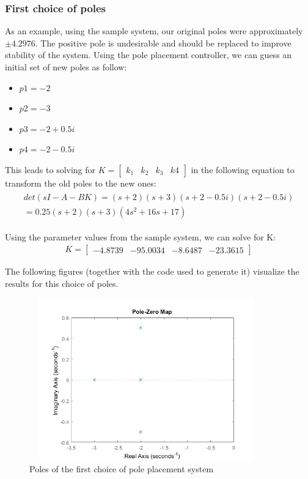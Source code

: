 \documentclass [12pt,letterpaper]{exam}
\begin{document}
\subsubsection{First choice of poles}
As an example, using the sample system, our original poles were approximately $\pm4.2976$. The positive pole is undesirable and should be replaced to improve stability of the system. Using the pole placement controller, we can guess an initial set of new poles as follow:
\begin{itemize}
    \item $p1 = -2$
    \item $p2 = -3$
    \item $p3 = -2 + 0.5i$
    \item $p4 = -2 - 0.5i$
\end{itemize}

This leads to solving for $K = \begin{bmatrix}
k_1 & k_2 & k_3 & k4
\end{bmatrix}$ in the following equation to transform the old poles to the new ones:
\begin{align}
\begin{split}
det(sI - A - BK) = (s + 2)(s + 3)(s + 2 - 0.5i)(s + 2 - 0.5i) \\
= 0.25(s + 2)(s + 3)(4s^2 + 16s + 17)
\end{split}
\end{align}

Using the parameter values from the sample system, we can solve for K:
\begin{align}
K = \begin{bmatrix}
-4.8739 & -95.0034 & -8.6487 & -23.3615
\end{bmatrix}
\end{align}

The following figures (together with the code used to generate it) visualize the results for this choice of poles.
\begin{figure}[H]
  \centering
    \includegraphics[width=10.15cm, height=7cm]{pl_poles} 
  \caption{Poles of the first choice of pole placement system}
  \label{fig:pl_poles}
\end{figure}
\end{document}

